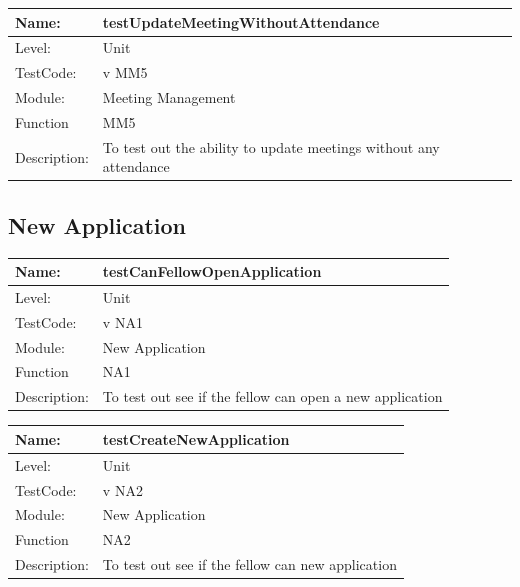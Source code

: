 \documentclass[12pt]{article}
\begin{document}
\begin{center}
\begin{tabular}{|l|p{12cm}|}
\hline

 Name: & testUpdateMeetingWithoutAttendance  \\
\hline
Level: & Unit \\
\hline
TestCode: & v MM5 \\
\hline
Module:& Meeting Management \\
\hline
Function & MM5 \\
\hline
Description: & To test out the ability to update meetings without any attendance  \\
\hline
\end{tabular}
\end{center}

\subsection{New Application}
\begin{center}
\begin{tabular}{|l|p{12cm}|}
\hline

 Name: & testCanFellowOpenApplication  \\
\hline
Level: & Unit \\
\hline
TestCode: & v NA1 \\
\hline
Module:& New Application\\
\hline
Function & NA1 \\
\hline
Description: & To test out see if the fellow can open a new application  \\
\hline

\end{tabular}
\end{center}

\begin{center}
\begin{tabular}{|l|p{12cm}|}
\hline

 Name: & testCreateNewApplication  \\
\hline
Level: & Unit \\
\hline
TestCode: & v NA2 \\
\hline
Module:& New Application\\
\hline
Function & NA2 \\
\hline
Description: & To test out see if the fellow can  new application  \\
\hline

\end{tabular}
\end{center}
\end{document}
